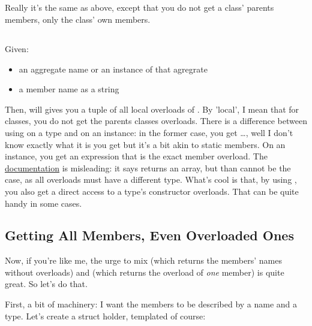 \subsection{}

Really it's the same as above, except that you do not get a class' parents members, only the class' own members.

\subsection{}

Given:

\begin{itemize}
\item an aggregate name or an instance of that agregrate
\item a member name as a string
\end{itemize}

Then,  will gives you a tuple of all local overloads of . By 'local', I mean that for classes, you do not get the parents classes overloads. There is a difference between using  on a type and on an instance: in the former case, you get \ldots, well I don't know exactly what it is you get but it's a bit akin to static members. On an instance, you get an expression that is the exact member overload. The \href{http://dlang.org/traits.html#getOverloads}{documentation} is misleading: it says  returns an array, but than cannot be the case, as all overloads must have a different type. What's cool is that, by using , you also get a direct access to a type's constructor overloads. That can be quite handy in some cases.



\subsection{Getting All Members, Even Overloaded Ones}

Now, if you're like me, the urge to mix  (which returns the members' names without overloads) and   (which returns the overload of \emph{one} member) is quite great. So let's do that.

First, a bit of machinery: I want the members to be described by a name and a type. Let's create a struct holder, templated of course:

